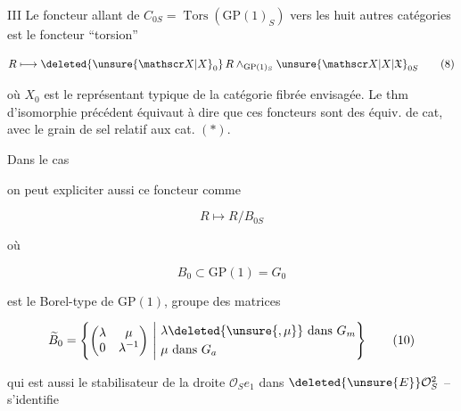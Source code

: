 III Le foncteur allant de $C_{0S}=\operatorname{Tors}(\mathrm{GP}(1)_S)$ vers les huit autres catégories est le foncteur ``torsion''

\[
R\longmapsto\deleted{\unsure{\mathscr X|X}_0}\,R\mathbin{\wedge}_{\mathrm{GP}(1)_S}\unsure{\mathscr X|X|\mathfrak X}_{0S}\tag*{(8)}
\]

où $X_0$ est le représentant typique  de la catégorie fibrée envisagée. Le thm d'isomorphie précédent équivaut à dire que ces foncteurs sont des équiv. de cat, avec le grain de sel  relatif aux cat. $(*)$.

Dans le cas


on peut expliciter aussi ce foncteur comme

\[
R\longmapsto R/B_{0S}\tag*{(9)}
\]

où

\[
B_0\subset \mathrm{GP}(1)=G_0\tag*{(10)}
\]

est le Borel-type de $\mathrm{GP}(1)$,    groupe des matrices

\[
\widetilde B_0=\left\{\begin{pmatrix}\lambda&\mu\\ 0&\lambda^{-1}\end{pmatrix}\ \middle|\ \begin{aligned}&\lambda\deleted{\unsure{,\mu}}\text{ dans }G_m\\&\mu\text{ dans }G_a\end{aligned}\right\}\tag*{(10)}
\]

 qui est aussi le stabilisateur de la droite $\mathcal O_S e_1$ dans $\deleted{\unsure{E}}\mathcal O_S^2$ -- s'identifie

